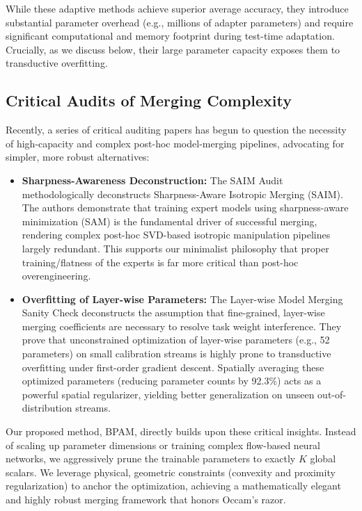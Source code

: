 While these adaptive methods achieve superior average accuracy, they introduce substantial parameter overhead (e.g., millions of adapter parameters) and require significant computational and memory footprint during test-time adaptation. Crucially, as we discuss below, their large parameter capacity exposes them to transductive overfitting.

\subsection{Critical Audits of Merging Complexity}
Recently, a series of critical auditing papers has begun to question the necessity of high-capacity and complex post-hoc model-merging pipelines, advocating for simpler, more robust alternatives:
\begin{itemize}
    \item {\bf Sharpness-Awareness Deconstruction:} The SAIM Audit \cite{saimaudit} methodologically deconstructs Sharpness-Aware Isotropic Merging (SAIM). The authors demonstrate that training expert models using sharpness-aware minimization (SAM) \cite{foret2020sharpness} is the fundamental driver of successful merging, rendering complex post-hoc SVD-based isotropic manipulation pipelines largely redundant. This supports our minimalist philosophy that proper training/flatness of the experts is far more critical than post-hoc overengineering.
    \item {\bf Overfitting of Layer-wise Parameters:} The Layer-wise Model Merging Sanity Check \cite{layerwiseaudit} deconstructs the assumption that fine-grained, layer-wise merging coefficients are necessary to resolve task weight interference. They prove that unconstrained optimization of layer-wise parameters (e.g., 52 parameters) on small calibration streams is highly prone to transductive overfitting under first-order gradient descent. Spatially averaging these optimized parameters (reducing parameter counts by 92.3\%) acts as a powerful spatial regularizer, yielding better generalization on unseen out-of-distribution streams.
\end{itemize}

Our proposed method, BPAM, directly builds upon these critical insights. Instead of scaling up parameter dimensions or training complex flow-based neural networks, we aggressively prune the trainable parameters to exactly $K$ global scalars. We leverage physical, geometric constraints (convexity and proximity regularization) to anchor the optimization, achieving a mathematically elegant and highly robust merging framework that honors Occam's razor.
